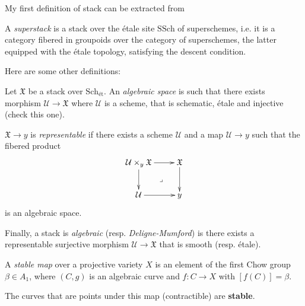 My first definition of stack can be extracted
from

\begin{definition}
\label{definition-superstack}
A {\it superstack} is a stack over
the étale site $\text{SSch}$ of superschemes,
i.e. it is a category fibered in groupoids
over the category of superschemes,
the latter equipped with the 
étale topology, 
satisfying the descent condition.
\end{definition}

Here are some other definitions:

\begin{definition}
\label{definition-algebraic-stacks}
Let  $\mathfrak{X}$ be a stack over $\text{Sch}_{\text{ét}}$.
An {\it algebraic space} is
such that there exists morphism
$\mathcal{U} \to \mathfrak{X}$
where $\mathcal{U}$ is a scheme, that is
schematic, étale and injective (check this one).

$\mathfrak{X} \to y$ is {\it representable} if
there exists a scheme $\mathcal{U}$ and a map
$\mathcal{U} \to y$ such that the 
fibered product
$$
\xymatrix{
\mathcal{U} \times_y \mathfrak{X}\ar[r]\ar[d]\ar@{}[dr]|-{\lrcorner}&\mathfrak{X}\ar[d]\\
\mathcal{U}\ar[r]&y
}
$$
is an algebraic space.

Finally, a  stack is {\it algebraic} (resp. {\it Deligne-Mumford})
is there exists a 
representable surjective morphism  $\mathcal{U} \to \mathfrak{X}$ 
that is smooth (resp. étale).

A {\it stable map} over a projective
variety $X$ is an element of the first
Chow group $\beta \in A_1$, where
 $(C,g)$ is an algebraic curve and
$f:C \to X$ with $[f(C)]=\beta$.
\end{definition}

\noindent
The curves that are points under this map
(contractible) are {\bf stable}.








